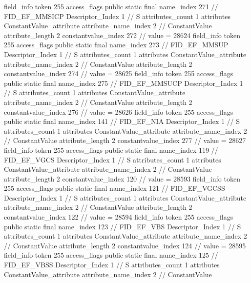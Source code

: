 {{{{{{				}
			}
			field_info {
				token	255
				access_flags	public static final
				name_index	271		// FID_EF_MMSICP
				Descriptor_Index	1		// S
				attributes_count	1
				attributes {
				ConstantValue_attribute {
					attribute_name_index	2		// ConstantValue
					attribute_length	2
					constantvalue_index	272		// value = 28624
				}
				}
			}
			field_info {
				token	255
				access_flags	public static final
				name_index	273		// FID_EF_MMSUP
				Descriptor_Index	1		// S
				attributes_count	1
				attributes {
				ConstantValue_attribute {
					attribute_name_index	2		// ConstantValue
					attribute_length	2
					constantvalue_index	274		// value = 28625
				}
				}
			}
			field_info {
				token	255
				access_flags	public static final
				name_index	275		// FID_EF_MMSUCP
				Descriptor_Index	1		// S
				attributes_count	1
				attributes {
				ConstantValue_attribute {
					attribute_name_index	2		// ConstantValue
					attribute_length	2
					constantvalue_index	276		// value = 28626
				}
				}
			}
			field_info {
				token	255
				access_flags	public static final
				name_index	141		// FID_EF_NIA
				Descriptor_Index	1		// S
				attributes_count	1
				attributes {
				ConstantValue_attribute {
					attribute_name_index	2		// ConstantValue
					attribute_length	2
					constantvalue_index	277		// value = 28627
				}
				}
			}
			field_info {
				token	255
				access_flags	public static final
				name_index	119		// FID_EF_VGCS
				Descriptor_Index	1		// S
				attributes_count	1
				attributes {
				ConstantValue_attribute {
					attribute_name_index	2		// ConstantValue
					attribute_length	2
					constantvalue_index	120		// value = 28593
				}
				}
			}
			field_info {
				token	255
				access_flags	public static final
				name_index	121		// FID_EF_VGCSS
				Descriptor_Index	1		// S
				attributes_count	1
				attributes {
				ConstantValue_attribute {
					attribute_name_index	2		// ConstantValue
					attribute_length	2
					constantvalue_index	122		// value = 28594
				}
				}
			}
			field_info {
				token	255
				access_flags	public static final
				name_index	123		// FID_EF_VBS
				Descriptor_Index	1		// S
				attributes_count	1
				attributes {
				ConstantValue_attribute {
					attribute_name_index	2		// ConstantValue
					attribute_length	2
					constantvalue_index	124		// value = 28595
				}
				}
			}
			field_info {
				token	255
				access_flags	public static final
				name_index	125		// FID_EF_VBSS
				Descriptor_Index	1		// S
				attributes_count	1
				attributes {
				ConstantValue_attribute {
					attribute_name_index	2		// ConstantValue
}}}}}}}

